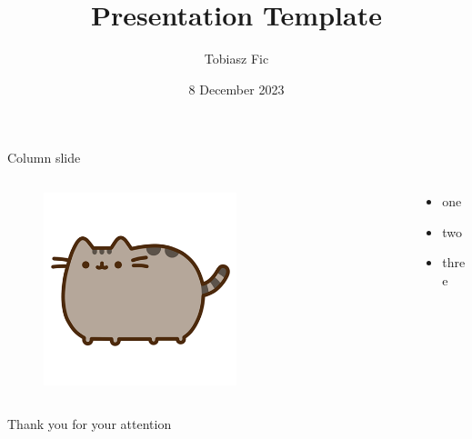 

\title{Presentation Template}
    \subtitle{\textit{}}
\author{Tobiasz Fic}
\date{8 December 2023}



\begin{frame}
    \maketitle
\end{frame}

\begin{frame}{Column slide}
    \begin{columns}
        \begin{column}{0.5\textwidth}
            \begin{figure}
                \centering
                \includegraphics[width=0.6\textwidth]{images/pusheen.png}
            \end{figure}
        \end{column}
        \begin{column}{0.5\textwidth}
            \begin{itemize}
                \item one
                \item two
                \item three
            \end{itemize}
        \end{column}
    \end{columns}

\end{frame}

\begin{frame}{}
    \centering
    \Large{Thank you for your attention}
\end{frame}

